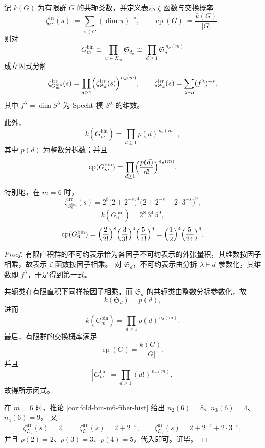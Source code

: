 \begin{theorem}\label{thm:conclusion-foldbin-gauge-zeta-conjugacy-commuting}
记 \(k(G)\) 为有限群 \(G\) 的共轭类数，并定义表示 \(\zeta\) 函数与交换概率
\[
\zeta_G^{\mathrm{irr}}(s):=\sum_{\pi\in\widehat G}(\dim \pi)^{-s},
\qquad
\operatorname{cp}(G):=\frac{k(G)}{|G|}.
\]
则对
\[
G_m^{\mathrm{bin}}\cong \prod_{w\in X_m}\mathfrak S_{d_w}
\cong \prod_{d\ge 1}\mathfrak S_d^{\,n_d(m)}
\]
成立因式分解
\[
\zeta_{G_m^{\mathrm{bin}}}^{\mathrm{irr}}(s)
=
\prod_{d\ge 1}\Bigl(\zeta_{\mathfrak S_d}^{\mathrm{irr}}(s)\Bigr)^{n_d(m)},
\qquad
\zeta_{\mathfrak S_d}^{\mathrm{irr}}(s)
=
\sum_{\lambda\vdash d}(f^\lambda)^{-s},
\]
其中 \(f^\lambda=\dim S^\lambda\) 为 Specht 模 \(S^\lambda\) 的维数。

此外，
\[
k(G_m^{\mathrm{bin}})
=
\prod_{d\ge 1} p(d)^{\,n_d(m)},
\]
其中 \(p(d)\) 为整数分拆数；并且
\[
\operatorname{cp}(G_m^{\mathrm{bin}})
=
\prod_{d\ge 1}\Bigl(\frac{p(d)}{d!}\Bigr)^{n_d(m)}.
\]

特别地，在 \(m=6\) 时，
\[
\zeta_{G_6^{\mathrm{bin}}}^{\mathrm{irr}}(s)
=
2^8\bigl(2+2^{-s}\bigr)^4\bigl(2+2^{-s}+2\cdot 3^{-s}\bigr)^9,
\]
\[
k(G_6^{\mathrm{bin}})
=
2^8\,3^4\,5^9,
\]
\[
\operatorname{cp}(G_6^{\mathrm{bin}})
=
\Bigl(\frac{2}{2!}\Bigr)^8
\Bigl(\frac{3}{3!}\Bigr)^4
\Bigl(\frac{5}{4!}\Bigr)^9
=
\Bigl(\frac12\Bigr)^4\Bigl(\frac{5}{24}\Bigr)^9.
\]
\end{theorem}
\begin{proof}
有限直积群的不可约表示恰为各因子不可约表示的外张量积，其维数按因子相乘，故表示 \(\zeta\) 函数按因子相乘。
对 \(\mathfrak S_d\)，不可约表示由分拆 \(\lambda\vdash d\) 参数化，其维数即 \(f^\lambda\)，于是得到第一式。

共轭类在有限直积下同样按因子相乘，而 \(\mathfrak S_d\) 的共轭类由整数分拆参数化，故
\[
k(\mathfrak S_d)=p(d),
\]
进而
\[
k(G_m^{\mathrm{bin}})=\prod_{d\ge 1}p(d)^{\,n_d(m)}.
\]
最后，有限群的交换概率满足
\[
\operatorname{cp}(G)=\frac{k(G)}{|G|},
\]
并且
\[
|G_m^{\mathrm{bin}}|
=
\prod_{d\ge 1}(d!)^{\,n_d(m)},
\]
故得所示闭式。

在 \(m=6\) 时，推论 \ref{cor:fold-bin-m6-fiber-hist} 给出 \(n_2(6)=8\)、\(n_3(6)=4\)、\(n_4(6)=9\)。
又
\[
\zeta_{\mathfrak S_2}^{\mathrm{irr}}(s)=2,\qquad
\zeta_{\mathfrak S_3}^{\mathrm{irr}}(s)=2+2^{-s},\qquad
\zeta_{\mathfrak S_4}^{\mathrm{irr}}(s)=2+2^{-s}+2\cdot 3^{-s},
\]
并且 \(p(2)=2\)、\(p(3)=3\)、\(p(4)=5\)，代入即可。证毕。
\end{proof}

